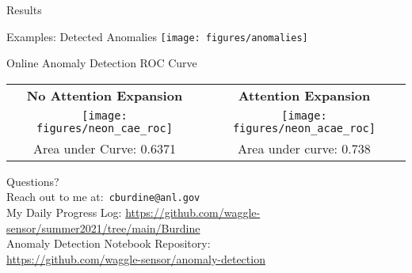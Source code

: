 \documentclass[10pt]{beamer}
\begin{document}
\begin{frame}{Results}
\begin{exampleblock}{Examples: Detected Anomalies}
\texttt{[image: figures/anomalies]}
\end{exampleblock}

\begin{exampleblock}{Online Anomaly Detection ROC Curve}
\begin{tabular}{c | c}
\textbf{No Attention Expansion} & \textbf{Attention Expansion}\\
\texttt{[image: figures/neon\_cae\_roc]} & \texttt{[image: figures/neon\_acae\_roc]} \\
Area under Curve:  0.6371 & Area under curve: 0.738 \\ 
\end{tabular}
\end{exampleblock}
\end{frame}


%
%
%
%
%
%
%
%

{
\begin{frame}[standout]
  Questions?\\[2mm]
  Reach out to me at:\ \texttt{cburdine@anl.gov}\\[1cm]
  \small{My Daily Progress Log:
  \href{https://github.com/waggle-sensor/summer2021/tree/main/Burdine}{https://github.com/waggle-sensor/summer2021/tree/main/Burdine}\\[6mm]
  Anomaly Detection Notebook Repository:\\[2mm]
  \href{https://github.com/waggle-sensor/anomaly-detection}{https://github.com/waggle-sensor/anomaly-detection}}
\end{frame}}
\end{document}

